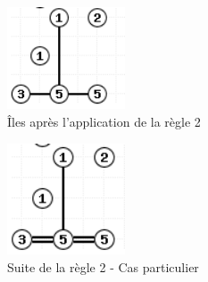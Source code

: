 \begin{figure}[htp]
  \centering
  \includegraphics[width=3.5cm]{images/Regle2_2}
  \caption{Îles après l'application de la règle 2}
\end{figure}

\begin{figure}[htp]
  \centering
  \includegraphics[width=3.5cm]{images/Regle2_3}
  \caption{Suite de la règle 2 - Cas particulier}
\end{figure}